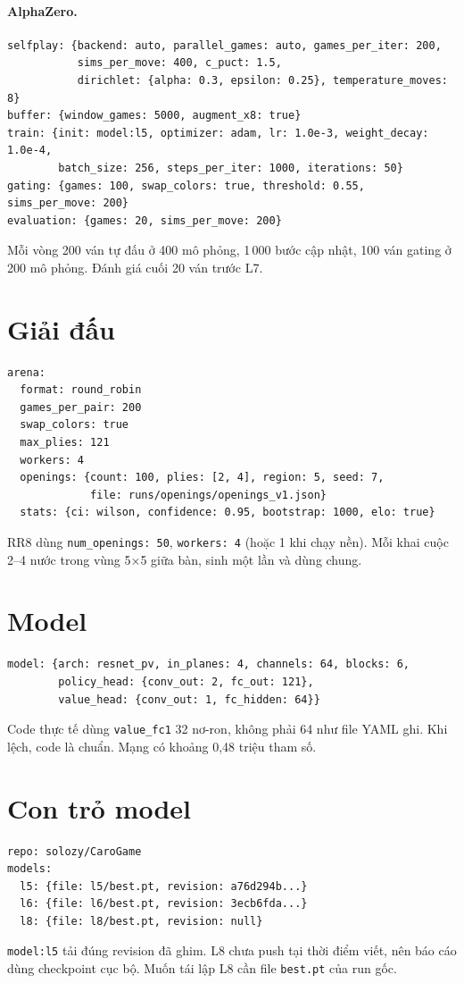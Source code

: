 \paragraph{AlphaZero.}
\begin{lstlisting}[numbers=none]
selfplay: {backend: auto, parallel_games: auto, games_per_iter: 200,
           sims_per_move: 400, c_puct: 1.5,
           dirichlet: {alpha: 0.3, epsilon: 0.25}, temperature_moves: 8}
buffer: {window_games: 5000, augment_x8: true}
train: {init: model:l5, optimizer: adam, lr: 1.0e-3, weight_decay: 1.0e-4,
        batch_size: 256, steps_per_iter: 1000, iterations: 50}
gating: {games: 100, swap_colors: true, threshold: 0.55, sims_per_move: 200}
evaluation: {games: 20, sims_per_move: 200}
\end{lstlisting}
Mỗi vòng 200 ván tự đấu ở 400 mô phỏng, 1\,000 bước cập nhật, 100 ván gating ở 200 mô phỏng.
Đánh giá cuối 20 ván trước L7.

\section{Giải đấu}
\begin{lstlisting}[numbers=none]
arena:
  format: round_robin
  games_per_pair: 200
  swap_colors: true
  max_plies: 121
  workers: 4
  openings: {count: 100, plies: [2, 4], region: 5, seed: 7,
             file: runs/openings/openings_v1.json}
  stats: {ci: wilson, confidence: 0.95, bootstrap: 1000, elo: true}
\end{lstlisting}
RR8 dùng \texttt{num\_openings: 50}, \texttt{workers: 4} (hoặc 1 khi chạy nền). Mỗi khai cuộc
2--4 nước trong vùng 5×5 giữa bàn, sinh một lần và dùng chung.

\section{Model}
\begin{lstlisting}[numbers=none]
model: {arch: resnet_pv, in_planes: 4, channels: 64, blocks: 6,
        policy_head: {conv_out: 2, fc_out: 121},
        value_head: {conv_out: 1, fc_hidden: 64}}
\end{lstlisting}
Code thực tế dùng \texttt{value\_fc1} 32 nơ-ron, không phải 64 như file YAML ghi. Khi lệch,
code là chuẩn. Mạng có khoảng 0,48 triệu tham số.

\section{Con trỏ model}
\begin{lstlisting}[numbers=none]
repo: solozy/CaroGame
models:
  l5: {file: l5/best.pt, revision: a76d294b...}
  l6: {file: l6/best.pt, revision: 3ecb6fda...}
  l8: {file: l8/best.pt, revision: null}
\end{lstlisting}
\texttt{model:l5} tải đúng revision đã ghim. L8 chưa push tại thời điểm viết, nên báo cáo dùng
checkpoint cục bộ. Muốn tái lập L8 cần file \texttt{best.pt} của run gốc.

